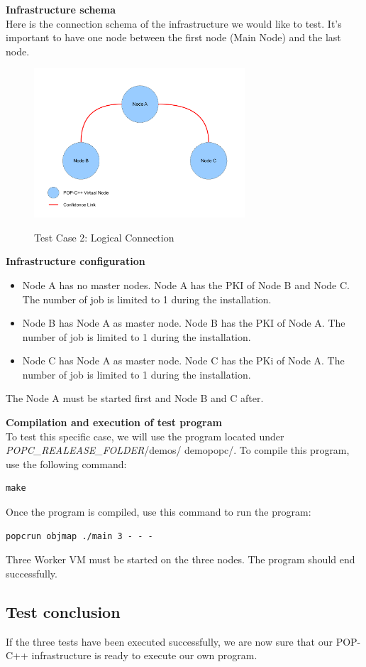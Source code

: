\textbf{Infrastructure schema}\\
Here is the connection schema of the infrastructure we would like to test. It's important to have one node between the first node (Main Node) and the last node. 
\begin{figure}[ht]
	\caption{Test Case 2: Logical Connection}
  	\centering
	\includegraphics[width=0.7\textwidth]{./pic/testcase1.pdf}
	\label{fig:testcase1}
\end{figure}

\textbf{Infrastructure configuration}\\
\begin{itemize}
\item Node A has no master nodes. Node A has the PKI of Node B and Node C. The number of job is limited to 1 during the installation.
\item Node B has Node A as master node. Node B has the PKI of Node A. The number of job is limited to 1 during the installation.
\item Node C has Node A as master node. Node C has the PKi of Node A. The number of job is limited to 1 during the installation.
\end{itemize}
The Node A must be started first and Node B and C after. \s

\textbf{Compilation and execution of test program}\\
To test this specific case, we will use the program located under \textit{POPC\_REALEASE\_FOLDER}/demos/ demopopc/. To compile this program, use the following command:\s

\begin{lstlisting}
make
\end{lstlisting}\s

Once the program is compiled, use this command to run the program:\s
\begin{lstlisting}
popcrun objmap ./main 3 - - -
\end{lstlisting}\s

Three Worker VM must be started on the three nodes. The program should end successfully. 




\subsection{Test conclusion}
If the three tests have been executed successfully, we are now sure that our POP-C++ infrastructure is ready to execute our own program.





